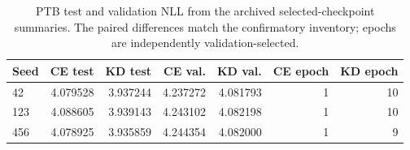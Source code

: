 \begingroup\small
\setlength{\tabcolsep}{5pt}
\begin{table}[htbp]\centering
\begin{tabular}{lrrrrrr}
\toprule
Seed & CE test & KD test & CE val. & KD val. & CE epoch & KD epoch \\
\midrule
42 & 4.079528 & 3.937244 & 4.237272 & 4.081793 & 1 & 10 \\
123 & 4.088605 & 3.939143 & 4.243102 & 4.082198 & 1 & 10 \\
456 & 4.078925 & 3.935859 & 4.244354 & 4.082000 & 1 & 9 \\
\bottomrule
\end{tabular}
\caption{PTB test and validation NLL from the archived selected-checkpoint summaries. The paired differences match the confirmatory inventory; epochs are independently validation-selected.}\label{tab:ptb_endpoints}
\end{table}
\endgroup

